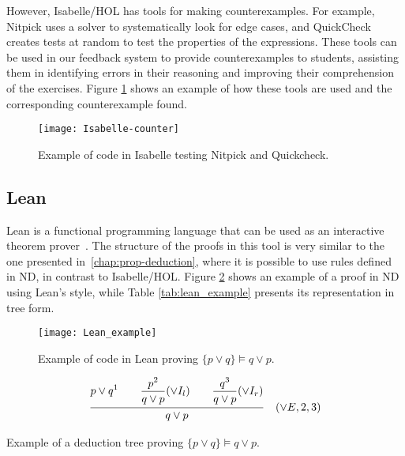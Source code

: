 However, Isabelle/HOL has tools for making counterexamples. For example, Nitpick uses a solver to systematically look for edge cases, and QuickCheck creates tests at random to test the properties of the expressions. These tools can be used in our feedback system to provide counterexamples to students, assisting them in identifying errors in their reasoning and improving their comprehension of the exercises. Figure \ref{img:isabelle-counter} shows an example of how these tools are used and the corresponding counterexample found.
\begin{figure}[htbp]
    \centering
    \texttt{[image: Isabelle-counter]}
    \caption{Example of code in Isabelle testing Nitpick and Quickcheck.}
    \label{img:isabelle-counter}
\end{figure}

\subsection{Lean}
\label{chap:lean}
Lean is a functional programming language that can be used as an interactive theorem prover~\cite{programming}. The structure of the proofs in this tool is very similar to the one presented in~\ref{chap:prop-deduction}, where it is possible to use rules defined in \gls{ND}, in contrast to Isabelle/HOL. Figure \ref{img:lean_example} shows an example of a proof in \gls{ND} using Lean's style, while Table \ref{tab:lean_example} presents its representation in tree form.

\begin{figure}[htbp]
    \centering
    \texttt{[image: Lean\_example]}
    \caption{Example of code in Lean proving \(\{p \lor q\} \models q \lor p \).}
    \label{img:lean_example}
\end{figure}
\begin{table}[h!]
    \centering
        \[
            \frac{ {\displaystyle {p \lor q}^1 
            \quad \quad \displaystyle \frac{\displaystyle p^2}{q \lor p \strut} (\lor I_l) \strut}
            \quad \quad \displaystyle \frac{\displaystyle q^3}{q \lor p \strut} (\lor I_r) \strut}
            {\displaystyle q \lor p \strut} \quad (\vee E, 2, 3)
          \]
          \caption{Example of a deduction tree proving \(\{p \lor q\} \models q \lor p \).}
          \label{tab:lean_example}
      \end{table}

